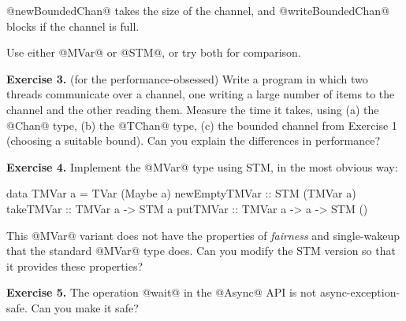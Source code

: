 \documentclass[11pt,a4paper]{article}
\begin{document}
\noindent @newBoundedChan@ takes the size of the channel, and
@writeBoundedChan@ blocks if the channel is full.

Use either @MVar@ or @STM@, or try both for comparison.

\textbf{Exercise 3.} (for the performance-obsessed) Write a program in which
two threads communicate over a channel, one writing a large number of
items to the channel and the other reading them.  Measure the time it
takes, using (a) the @Chan@ type, (b) the @TChan@ type, (c) the
bounded channel from Exercise 1 (choosing a suitable bound).  Can you
explain the differences in performance?

\textbf{Exercise 4.} Implement the @MVar@ type using STM, in the most
obvious way:

\begin{haskell}
data TMVar a = TVar (Maybe a)
newEmptyTMVar :: STM (TMVar a)
takeTMVar     :: TMVar a -> STM a
putTMVar      :: TMVar a -> a -> STM ()
\end{haskell}

This @MVar@ variant does not have the properties of \emph{fairness}
and {single-wakeup} that the standard @MVar@ type does.  Can you
modify the STM version so that it provides these properties?

\textbf{Exercise 5.} The operation @wait@ in the @Async@ API is not
async-exception-safe.  Can you make it safe?

\end{document}
